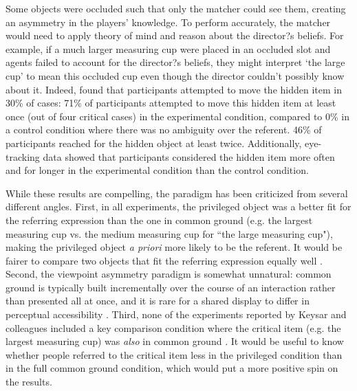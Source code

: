 \documentclass[10pt,letterpaper]{article}
\begin{document}
Some objects were occluded such that only the matcher could see them, creating an asymmetry in the players' knowledge. To perform accurately, the matcher would need to apply theory of mind and reason about the director?s beliefs. For example, if a much larger measuring cup were placed in an occluded slot and agents failed to account for the director?s beliefs, they might interpret `the large cup' to mean this occluded cup even though the director couldn't possibly know about it. Indeed,  found that participants attempted to move the hidden item in 30\% of cases: 71\% of participants attempted to move this hidden item at least once (out of four critical cases) in the experimental condition, compared to 0\% in a control condition where there was no ambiguity over the referent. 46\% of participants reached for the hidden object at least twice. Additionally, eye-tracking data showed that participants considered the hidden item more often and for longer in the experimental condition than the control condition. 

While these results are compelling, the paradigm has been criticized from several different angles. First, in all experiments, the privileged object was a better fit for the referring expression than the one in common ground (e.g. the largest measuring cup vs. the medium measuring cup for ``the large measuring cup"), making the privileged object \emph{a priori} more likely to be the referent. It would be fairer to compare two objects that fit the referring expression equally well \cite{HellerGrodnerTanenhaus08_Perspective}. Second, the viewpoint asymmetry paradigm is somewhat unnatural: common ground is typically built incrementally over the course of an interaction rather than presented all at once, and it is rare for a shared display to differ in perceptual accessibility \cite{HannaTanenhausTrueswell03_CommonGroundPerspective}. Third, none of the experiments reported by Keysar and colleagues included a key comparison condition where the critical item (e.g. the largest measuring cup) was \emph{also} in common ground \cite{BrownSchmidtHanna11_IncrementalPerspectiveTaking}. It would be useful to know whether people referred to the critical item less in the privileged condition than in the full common ground condition, which would put a more positive spin on the results. %
\end{document}
